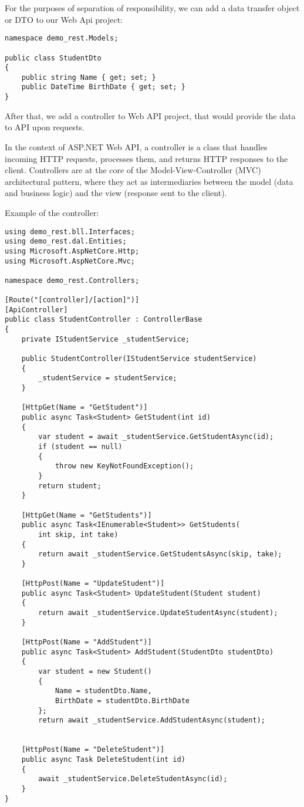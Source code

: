 For the purposes of separation of responsibility, we can add a data transfer object or DTO to our Web Api project:

\begin{lstlisting}
namespace demo_rest.Models;

public class StudentDto
{
    public string Name { get; set; }
    public DateTime BirthDate { get; set; }
}

\end{lstlisting}

After that, we add a controller to Web API project, that would provide the data to API upon requests.

In the context of ASP.NET Web API, a controller is a class that handles incoming HTTP requests, processes them, and returns HTTP responses to the client. Controllers are at the core of the Model-View-Controller (MVC) architectural pattern, where they act as intermediaries between the model (data and business logic) and the view (response sent to the client).

Example of the controller:

\begin{lstlisting}
using demo_rest.bll.Interfaces;
using demo_rest.dal.Entities;
using Microsoft.AspNetCore.Http;
using Microsoft.AspNetCore.Mvc;

namespace demo_rest.Controllers;

[Route("[controller]/[action]")]
[ApiController]
public class StudentController : ControllerBase
{
    private IStudentService _studentService;

    public StudentController(IStudentService studentService)
    {
        _studentService = studentService;
    }

    [HttpGet(Name = "GetStudent")]
    public async Task<Student> GetStudent(int id)
    {
        var student = await _studentService.GetStudentAsync(id);
        if (student == null)
        {
            throw new KeyNotFoundException();
        }
        return student;
    }

    [HttpGet(Name = "GetStudents")]
    public async Task<IEnumerable<Student>> GetStudents(
        int skip, int take)
    {
        return await _studentService.GetStudentsAsync(skip, take);
    }

    [HttpPost(Name = "UpdateStudent")]
    public async Task<Student> UpdateStudent(Student student)
    {
        return await _studentService.UpdateStudentAsync(student);
    }

    [HttpPost(Name = "AddStudent")]
    public async Task<Student> AddStudent(StudentDto studentDto)
    {
        var student = new Student()
        {
            Name = studentDto.Name,
            BirthDate = studentDto.BirthDate
        };
        return await _studentService.AddStudentAsync(student);


    [HttpPost(Name = "DeleteStudent")]
    public async Task DeleteStudent(int id)
    {
        await _studentService.DeleteStudentAsync(id);
    }
}

\end{lstlisting}

